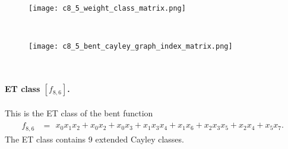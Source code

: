 \begin{figure}[!bhpt] %
\centering
\begin{minipage}{.48\textwidth}
  \centering
  \texttt{[image: c8\_5\_weight\_class\_matrix.png]}
  \label{fig:c8_5_weight_class_matrix}
\end{minipage}%
~~~~
\begin{minipage}{.48\textwidth}
  \centering
  \texttt{[image: c8\_5\_bent\_cayley\_graph\_index\_matrix.png]}
  \label{fig:c8_5_bent_cayley_graph_index_matrix}
\end{minipage}
\end{figure}
~
\paragraph*{ET class $[f_{8,6}]$.}
%
%
This is the ET class of the bent function
\small{}
\begin{align*}
f_{ 8 , 6 } &=
\begin{array}{l}
x_{0} x_{1} x_{2} + x_{0} x_{2} + x_{0} x_{3} + x_{1} x_{3} x_{4} + x_{1} x_{6} + x_{2} x_{3} x_{5}
+ x_{2} x_{4} + x_{5} x_{7}.
\end{array}
\end{align*}
\normalsize{}
The ET class contains 9 extended Cayley classes.


